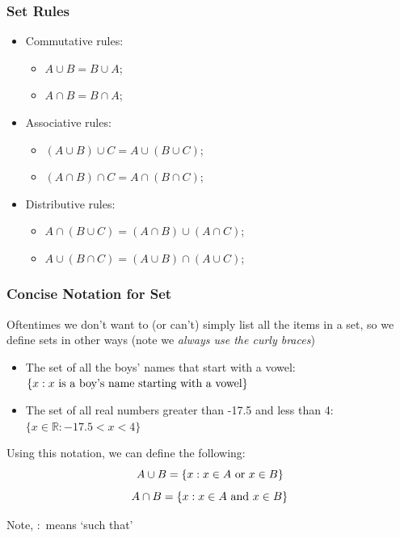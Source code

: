 \documentclass[aspectratio=169]{beamer}
\numberwithin{equation}{section}
\begin{document}
\begin{frame}
\frametitle{Set Rules}


\begin{itemize}
\item Commutative rules:
\begin{itemize}
\item $A \cup B = B\cup A$;
\item $A \cap B = B\cap A$;
\end{itemize}
\item Associative rules:
\begin{itemize}
\item $(A \cup B) \cup C = A \cup (B \cup C)$;
\item $(A \cap B) \cap C = A \cap (B \cap C)$;
\end{itemize}
\item Distributive rules:
\begin{itemize}
\item $A \cap (B \cup C) = (A \cap B) \cup (A \cap C)$;
\item $A \cup (B \cap C) = (A \cup B) \cap (A \cup C)$;
\end{itemize}
\end{itemize}
\end{frame}



\begin{frame}
\frametitle{Concise Notation for Set}

Oftentimes we don't want to (or can't) simply list all the items in a set, so we define sets in other ways (note  we \textit{always use the curly braces}) \pause

\begin{itemize}
\item The set of all the boys' names that start with a vowel: $\{x: x\hbox{ is a boy's name starting with a vowel}\}$
\item The set of all real numbers greater than -17.5 and less than 4: $\{x\in \mathbb{R}:-17.5<x<4\}$ \pause
\end{itemize}
 
Using this notation, we can define the following:
$$A\cup B=\{x: x\in A \hbox{ or } x\in B\}$$
$$A\cap B=\{x: x\in A \hbox{ and } x\in B\}$$

Note, $:$ means `such that'
\end{frame}
\end{document}
